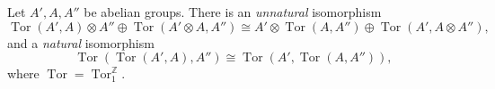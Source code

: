 Let $A', A, A''$ be abelian groups. There is an \emph{unnatural} isomorphism
$$\operatorname{Tor}(A', A) \otimes A'' \oplus \operatorname{Tor}(A' \otimes A, A'') \cong A' \otimes \operatorname{Tor}(A, A'') \oplus \operatorname{Tor}(A', A \otimes A''),$$
and a \emph{natural} isomorphism
$$\operatorname{Tor}(\operatorname{Tor}(A', A), A'') \cong \operatorname{Tor}(A', \operatorname{Tor}(A, A'')),$$
where $\operatorname{Tor} = \operatorname{Tor}_1^{\mathbb{Z}}$.
